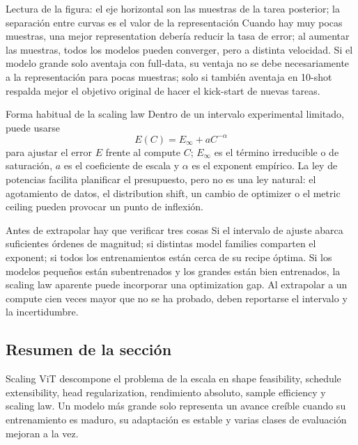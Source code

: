 \begin{knowledgebox}{Lectura de la figura: el eje horizontal son las muestras de la tarea posterior; la separación entre curvas es el valor de la representación}
Cuando hay muy pocas muestras, una mejor representation debería reducir la tasa de error; al aumentar las muestras, todos los modelos pueden converger, pero a distinta velocidad. Si el modelo grande solo aventaja con full-data, su ventaja no se debe necesariamente a la representación para pocas muestras; solo si también aventaja en 10-shot respalda mejor el objetivo original de hacer el kick-start de nuevas tareas.
\end{knowledgebox}


\begin{importantbox}{Forma habitual de la scaling law}
Dentro de un intervalo experimental limitado, puede usarse
\[
E(C)=E_{\infty}+aC^{-\alpha}
\]
para ajustar el error $E$ frente al compute $C$; $E_{\infty}$ es el término irreducible o de saturación, $a$ es el coeficiente de escala y $\alpha$ es el exponent empírico. La ley de potencias facilita planificar el presupuesto, pero no es una ley natural: el agotamiento de datos, el distribution shift, un cambio de optimizer o el metric ceiling pueden provocar un punto de inflexión.
\end{importantbox}

\begin{warningbox}{Antes de extrapolar hay que verificar tres cosas}
Si el intervalo de ajuste abarca suficientes órdenes de magnitud; si distintas model families comparten el exponent; si todos los entrenamientos están cerca de su recipe óptima. Si los modelos pequeños están subentrenados y los grandes están bien entrenados, la scaling law aparente puede incorporar una optimization gap. Al extrapolar a un compute cien veces mayor que no se ha probado, deben reportarse el intervalo y la incertidumbre.
\end{warningbox}

\subsection{Resumen de la sección}

Scaling ViT descompone el problema de la escala en shape feasibility, schedule extensibility, head regularization, rendimiento absoluto, sample efficiency y scaling law. Un modelo más grande solo representa un avance creíble cuando su entrenamiento es maduro, su adaptación es estable y varias clases de evaluación mejoran a la vez.
